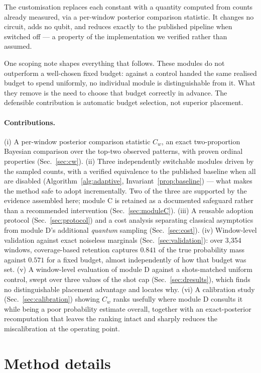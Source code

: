 \documentclass[final,5p,times,longtitle]{elsarticle}
\newcommand{\Cw}{C_w}
\begin{document}
The customisation replaces each constant with a quantity computed from
counts already measured, via a per-window posterior comparison statistic.
It changes no circuit, adds no qubit, and reduces exactly to the published
pipeline when switched off --- a property of the implementation we verified
rather than assumed.

One scoping note shapes everything that follows. These modules do not
outperform a well-chosen fixed budget: against a control handed the same
realised budget to spend uniformly, no individual module is
distinguishable from it. What they remove is the need to choose that budget
correctly in advance. The defensible contribution is automatic budget
selection, not superior placement.

\paragraph{Contributions.} (i) A per-window posterior comparison statistic
$\Cw$, an exact two-proportion Bayesian comparison over the top-two
observed patterns, with proven ordinal properties (Sec.~\ref{sec:cw}).
(ii) Three independently switchable modules driven by the sampled counts,
with a verified equivalence to the published baseline when all are disabled
(Algorithm~\ref{alg:adaptive}, Invariant~\ref{prop:baseline}) --- what makes
the method safe to adopt incrementally. Two of the three are supported by
the evidence assembled here; module C is retained as a documented
safeguard rather than a recommended intervention (Sec.~\ref{sec:moduleC}). (iii) A reusable adoption protocol
(Sec.~\ref{sec:protocol}) and a cost analysis separating classical
asymptotics from module D's additional \emph{quantum} sampling
(Sec.~\ref{sec:cost}). (iv) Window-level validation against exact noiseless
marginals (Sec.~\ref{sec:validation}): over 3{,}354 windows, coverage-based
retention captures $0.841$ of the true probability mass against $0.571$ for
a fixed budget, almost independently of how that budget was set. (v) A window-level evaluation of module D against a shots-matched uniform
control, swept over three values of the shot cap (Sec.~\ref{sec:dresults}),
which finds no distinguishable placement advantage and locates why.
(vi) A calibration study (Sec.~\ref{sec:calibration}) showing $\Cw$ ranks
usefully where module D consults it while being a poor probability estimate
overall, together with an exact-posterior recomputation that leaves the
ranking intact and sharply reduces the miscalibration at the operating
point.
\section{Method details}
\end{document}
